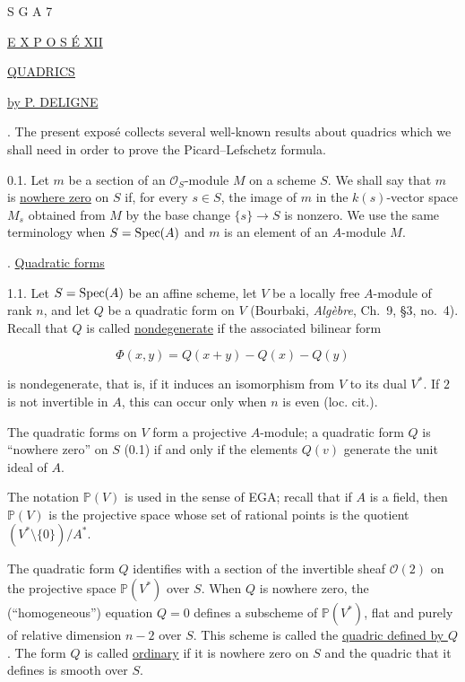 \clearpage
\begin{center}
S G A 7

\bigskip
\underline{E X P O S É XII}

\bigskip
\underline{\underline{QUADRICS}}

\bigskip
\underline{by P. DELIGNE}
\end{center}

. The present exposé collects several well-known results about
quadrics which we shall need in order to prove the Picard--Lefschetz
formula.

0.1. Let $m$ be a section of an $\mathcal O_S$-module $M$ on a scheme
$S$.  We shall say that $m$ is \underline{nowhere zero} on $S$ if, for
every $s\in S$, the image of $m$ in the $k(s)$-vector space $M_s$ obtained
from $M$ by the base change $\{s\}\longrightarrow S$ is nonzero.  We use
the same terminology when $S=\operatorname{Spec}(A)$ and $m$ is an element of an
$A$-module $M$.

. \underline{Quadratic forms}

1.1. Let $S=\operatorname{Spec}(A)$ be an affine scheme, let $V$ be a locally free
$A$-module of rank $n$, and let $Q$ be a quadratic form on $V$
(Bourbaki, \emph{Algèbre}, Ch.~9, \S3, no.~4).  Recall that $Q$ is called
\underline{nondegenerate} if the associated bilinear form

\begin{equation*}
\Phi(x,y)=Q(x+y)-Q(x)-Q(y)
\end{equation*}

is nondegenerate, that is, if it induces an isomorphism from $V$ to its
dual $V^*$.  If $2$ is not invertible in $A$, this can occur only when
$n$ is even (loc. cit.).


The quadratic forms on $V$ form a projective $A$-module; a quadratic form
$Q$ is ``nowhere zero'' on $S$ (0.1) if and only if the elements $Q(v)$
generate the unit ideal of $A$.

The notation $\mathbb P(V)$ is used in the sense of EGA; recall that if
$A$ is a field, then $\mathbb P(V)$ is the projective space whose set of
rational points is the quotient $(V^*\setminus\{0\})/A^*$.

The quadratic form $Q$ identifies with a section of the invertible sheaf
$\mathcal O(2)$ on the projective space $\mathbb P(V^*)$ over $S$.  When
$Q$ is nowhere zero, the (``homogeneous'') equation $Q=0$ defines a
subscheme of $\mathbb P(V^*)$, flat and purely of relative dimension
$n-2$ over $S$.  This scheme is called the \underline{quadric defined by
$Q$}.  The form $Q$ is called \underline{ordinary} if it is nowhere zero
on $S$ and the quadric that it defines is smooth over $S$.

